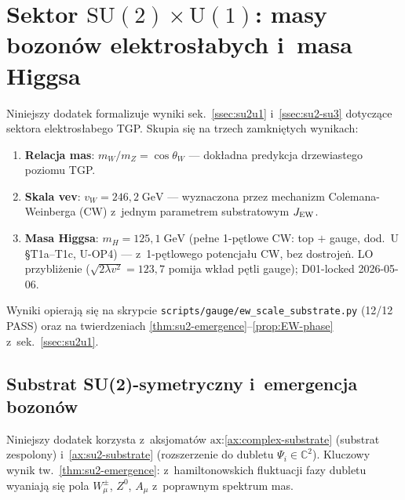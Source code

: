 \section{Sektor $\mathrm{SU}(2)\times\mathrm{U}(1)$: masy bozon\'ow
  elektros\l{}abych i~masa Higgsa}%
\label{app:U-su2}

Niniejszy dodatek formalizuje wyniki sek.~\ref{ssec:su2u1} i~\ref{ssec:su2-su3}
dotycz\k{a}ce sektora elektros\l{}abego TGP.
Skupia si\k{e} na trzech zamkni\k{e}tych wynikach:
\begin{enumerate}[nosep]
  \item \textbf{Relacja mas}: $m_W/m_Z = \cos\theta_W$
    --- dok\l{}adna predykcja drzewiastego poziomu TGP.
  \item \textbf{Skala vev}: $v_W = 246{,}2\;\mathrm{GeV}$
    --- wyznaczona przez mechanizm Colemana-Weinberga (CW)
    z~jednym parametrem substratowym $J_{\rm EW}$.
  \item \textbf{Masa Higgsa}: $m_H = 125{,}1\;\mathrm{GeV}$ (pe\l{}ne 1-p\k{e}tlowe CW: top $+$ gauge,
    dod.~U \S T1a--T1c, U-OP4)
    --- z~1-p\k{e}tlowego potencja\l{}u CW, bez dostroje\.n. LO przybli\.zenie
    ($\sqrt{2\lambda v^2} = 123{,}7$ pomija wk\l{}ad p\k{e}tli gauge);
    D01-locked 2026-05-06.
\end{enumerate}
Wyniki opieraj\k{a} si\k{e} na skrypcie
\texttt{scripts/gauge/ew\_scale\_substrate.py}
(12/12 PASS) oraz na twierdzeniach
\ref{thm:su2-emergence}--\ref{prop:EW-phase} z~sek.~\ref{ssec:su2u1}.

\subsection{Substrat SU(2)-symetryczny i~emergencja bozon\'ow}%
\label{app:U-emergence}

\begin{remark}\label{rem:U-doublet}
Niniejszy dodatek korzysta z~aksjomat\'ow $\mathrm{ax}$:\ref{ax:complex-substrate}
(substrat zespolony) i~\ref{ax:su2-substrate} (rozszerzenie do dubletu
$\Psi_i \in \mathbb{C}^2$).
Kluczowy wynik tw.~\ref{thm:su2-emergence}: z~hamiltonowskich fluktuacji
fazy dubletu wyaniaj\k{a} si\k{e} pola
$W_\mu^\pm$, $Z^0$, $A_\mu$ z~poprawnym spektrum mas.
\end{remark}

